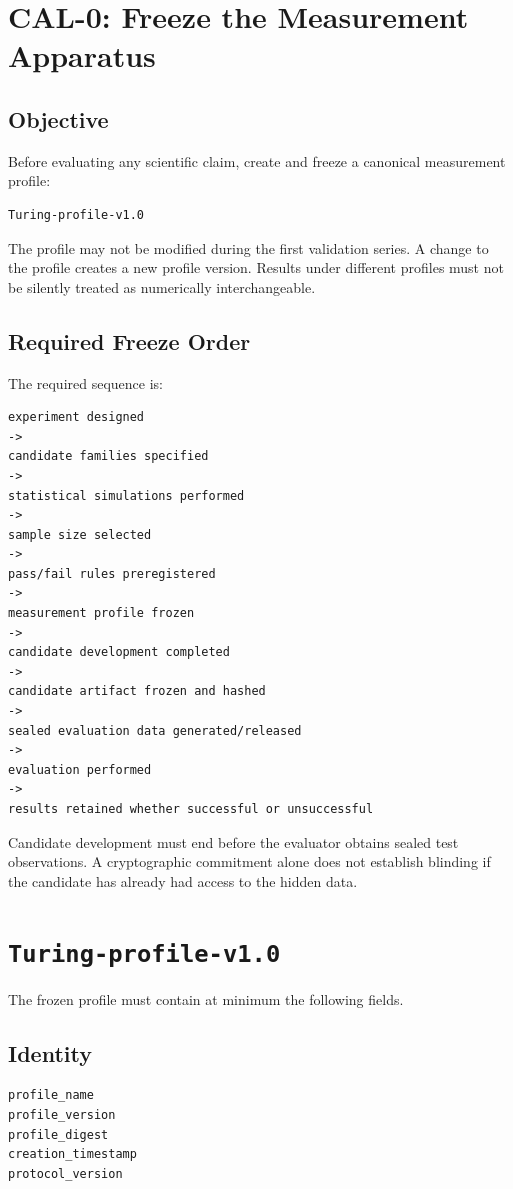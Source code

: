 \documentclass[11pt]{article}
\begin{document}
\section{CAL-0: Freeze the Measurement Apparatus}

\subsection{Objective}

Before evaluating any scientific claim, create and freeze a canonical measurement profile:
\begin{verbatim}
Turing-profile-v1.0
\end{verbatim}
The profile may not be modified during the first validation series. A change to the profile creates a new profile version. Results under different profiles must not be silently treated as numerically interchangeable.

\subsection{Required Freeze Order}

The required sequence is:
\begin{verbatim}
experiment designed
->
candidate families specified
->
statistical simulations performed
->
sample size selected
->
pass/fail rules preregistered
->
measurement profile frozen
->
candidate development completed
->
candidate artifact frozen and hashed
->
sealed evaluation data generated/released
->
evaluation performed
->
results retained whether successful or unsuccessful
\end{verbatim}
Candidate development must end before the evaluator obtains sealed test observations. A cryptographic commitment alone does not establish blinding if the candidate has already had access to the hidden data.

\section{\texttt{Turing-profile-v1.0}}

The frozen profile must contain at minimum the following fields.

\subsection{Identity}
\begin{verbatim}
profile_name
profile_version
profile_digest
creation_timestamp
protocol_version
\end{verbatim}
\end{document}
